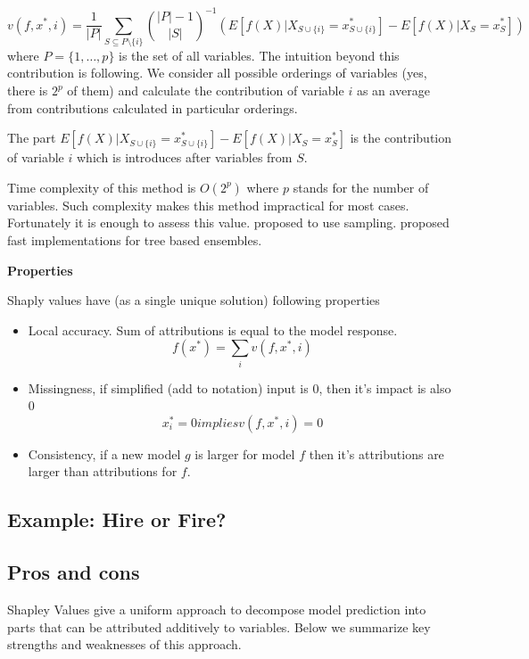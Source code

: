 \documentclass[12pt,]{krantz}
\providecommand{\tightlist}{%
  \setlength{\itemsep}{0pt}\setlength{\parskip}{0pt}}
\theoremstyle{definition}
\theoremstyle{definition}
\theoremstyle{definition}
\theoremstyle{remark}
\begin{document}
\[
v(f, x^*, i) = \frac 1{|P|}\sum_{S \subseteq P\setminus \{i\}}  {{|P|-1}\choose{|S|}}^{-1} \left(E [f(X) | X_{S \cup \{i\}} = x^*_{S \cup \{i\}}] - E [f(X) | X_{S} = x^*_{S}]\right)
\] where \(P = \{1, \ldots, p\}\) is the set of all variables. The
intuition beyond this contribution is following. We consider all
possible orderings of variables (yes, there is \(2^p\) of them) and
calculate the contribution of variable \(i\) as an average from
contributions calculated in particular orderings.

The part
\(E[f(X) | X_{S \cup \{i\}} = x^*_{S \cup \{i\}}] - E [f(X) | X_{S} = x^*_{S}]\)
is the contribution of variable \(i\) which is introduces after
variables from \(S\).

Time complexity of this method is \(O(2^p)\) where \(p\) stands for the
number of variables. Such complexity makes this method impractical for
most cases. Fortunately it is enough to assess this value.
\citep{Strumbelj2014} proposed to use sampling. \citep{TreeSHAP}
proposed fast implementations for tree based ensembles.

\textbf{Properties}

Shaply values have (as a single unique solution) following properties

\begin{itemize}
\tightlist
\item
  Local accuracy. Sum of attributions is equal to the model response. \[
  f(x^*) = \sum_{i}   v(f, x^*, i) 
  \]
\item
  Missingness, if simplified (add to notation) input is 0, then it's
  impact is also 0 \[
  x_i^* = 0 implies   v(f, x^*, i) = 0
  \]
\item
  Consistency, if a new model \(g\) is larger for model \(f\) then it's
  attributions are larger than attributions for \(f\).
\end{itemize}

\hypertarget{example-hire-or-fire-2}{%
\subsection{Example: Hire or Fire?}\label{example-hire-or-fire-2}}

\hypertarget{pros-and-cons-7}{%
\subsection{Pros and cons}\label{pros-and-cons-7}}

Shapley Values give a uniform approach to decompose model prediction
into parts that can be attributed additively to variables. Below we
summarize key strengths and weaknesses of this approach.
\end{document}
